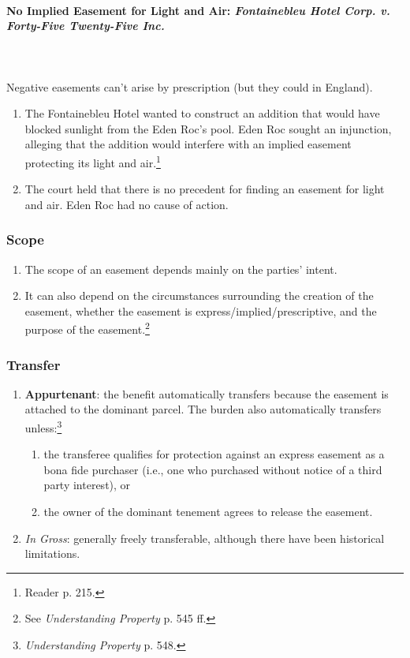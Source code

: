 \paragraph{No Implied Easement for Light and Air: \emph{Fontainebleu Hotel 
Corp. v. Forty-Five Twenty-Five Inc.}}
~\\\\
Negative easements can't arise by prescription (but they could in England).

\begin{enumerate}
    \item The Fontainebleu Hotel wanted to construct an addition that would 
    have blocked sunlight from the Eden Roc's pool. Eden Roc sought an 
    injunction, alleging that the addition would interfere with an implied 
    easement protecting its light and air.\footnote{Reader p. 215.}
    \item The court held that there is no precedent for finding an easement 
    for light and air. Eden Roc had no cause of action.
\end{enumerate}

\subsubsection{Scope}

\begin{enumerate}
    \item The scope of an easement depends mainly on the parties' intent.
    \item It can also depend on the circumstances surrounding the creation of 
    the easement, whether the easement is express/implied/prescriptive, and 
    the purpose of the easement.\footnote{See \emph{Understanding Property} 
    p. 545 ff.}
\end{enumerate}

\subsubsection{Transfer}

\begin{enumerate}
    \item \textbf{Appurtenant}: the benefit automatically transfers because 
    the easement is attached to the dominant parcel. The burden also 
    automatically transfers unless:\footnote{\emph{Understanding Property} p. 
    548.}
    \begin{enumerate}
        \item the transferee qualifies for protection against an express 
        easement as a bona fide purchaser (i.e., one who purchased without 
        notice of a third party interest), or
        \item the owner of the dominant tenement agrees to release the 
        easement.
    \end{enumerate}
    \item \emph{In Gross}: generally freely transferable, although there have 
    been historical limitations.
\end{enumerate}

